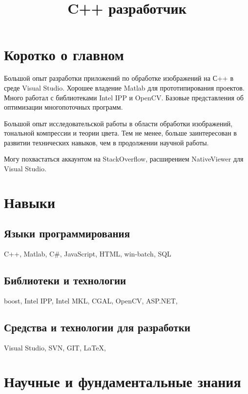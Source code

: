 \documentclass[11pt,a4paper,final]{moderncv}
\title{C++ разработчик}                               %
\begin{document}
\maketitle

\section{Коротко о главном}

Большой опыт разработки приложений по обработке изображений на С++ в среде Visual Studio. Хорошее владение Matlab для прототипирования проектов. Много работал с библиотеками Intel IPP и OpenCV. Базовые представления об оптимизации многопоточных программ.

Большой опыт исследовательской работы в области обработки изображений, тональной компрессии и теории цвета. Тем не менее, больше заинтересован в развитии технических навыков, чем в продолжении научной работы.

Могу похвастаться аккаунтом на StackOverflow, расширением NativeViewer для Visual Studio.

\section{Навыки}

\subsection{Языки программирования}

C++, Matlab, C\#, JavaScript, HTML, win-batch, SQL

\subsection{Библиотеки и технологии}

boost, Intel IPP, Intel MKL, CGAL, OpenCV, ASP.NET, 

\subsection{Средства и технологии для разработки}

Visual Studio, SVN, GIT, LaTeX, 



\section{Научные и фундаментальные знания}
\end{document}
